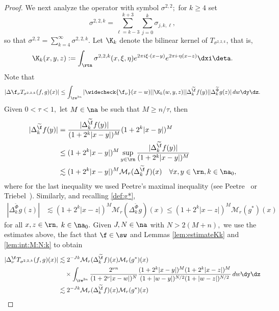 \begin{proof}
We next analyze the operator with  symbol $\sigma^{2,2};$ for $k \geq 4$ set 
\begin{equation*}
\sigma^{2,2,k}  = \sum\limits_{\ell =k-3}^{k+3} \sum\limits_{j=0}^k \sigma_{j,k,\ell},
\end{equation*}
so that $\sigma^{2,2} = \sum\limits_{k=4}^\infty \sigma^{2,2,k}.$ 
 Let $\K_k$ denote the bilinear kernel of  $T_{\sigma^{2,2,k}}$, that is,
$$
\K_k(x,y,z):= \int_{\rtn} \sigma^{2,2,k}(x, \xi, \eta) e^{2\pi i \xi \cdot( x- y)} e^{2\pi i \cdot \eta (x-z)} \dxi \deta.
$$
Note that
\begin{align*}
| \Delta{\f}_\nu T_{\sigma^{2,2,k}}(f,g)(x)| \leq \int_{\re^{3n}} |\widecheck{\f_\nu}(x- w)| |\K_k(w, y, z)| |\Delta^{\widetilde{\f}}_k f(y)| |\Delta^{\widetilde{\Phi}}_k g(z)| \, dw \dy \dz.
\end{align*}
Given $0<\tau <1,$  let $M \in \na$ be such that $M \geq n/\tau$, then
\begin{align*}
|\Delta^{\widetilde{\f}}_k f(y)|&  = \frac{|\Delta^{\widetilde{\f}}_k f(y)|}{(1 + 2^k |x-y|)^M} (1 + 2^k |x-y|)^M\\
& \leq  (1 + 2^k |x-y|)^M \sup_{y\in\rn} \frac{|\Delta^{\widetilde{\f}}_k f(y)|}{(1 + 2^k |x-y|)^M} \\
& \lesssim (1 + 2^k |x-y|)^M \mathcal{M}_r(\Delta^{\widetilde{\f}}_k f)(x)\quad\forall x,y\in\rn,k\in\na_0,
\end{align*}
where for the last inequality we used Peetre's maximal inequality (see Peetre~\cite{MR0380394} or Triebel~\cite[p.16, Theorem 1.3.1]{MR3024598}). Similarly, and recalling \eqref{def:g*},
\begin{align*}
|\Delta^{\widetilde{\Phi}}_k g(z)| & \lesssim (1 + 2^k |x-z|)^M \mathcal{M}_r(\Delta^{\widetilde{\Phi}}_k g)(x)  \leq (1 + 2^k |x-z|)^M \mathcal{M}_r(g^*)(x)
\end{align*}
for all $ x,z\in\rn,$ $k\in\na_0.$
Given $J, N \in \na$ with $N>2(M+n),$  we use the estimates above, the fact that $\f\in\sw$ and Lemmas \ref{lem:estimateKk} and  \ref{lem:int:M:N:k} to obtain 
\begin{align*}
 |\Delta^{\f}_\nu T_{\sigma^{2,2,k}}(f,g)(x)| &\lesssim 2^{-Jk} \mathcal{M}_r(\Delta^{\widetilde{\f}}_k f)(x) \mathcal{M}_r(g^*)(x)\\
 &\quad\times \int_{\re^{3n}} \frac{2^{\nu n}}{(1+ 2^\nu |x- w|)^N} \frac{(1 + 2^k |x-y|)^M (1 + 2^k |x-z|)^M}{(1+ |w-y|)^{N/2} (1+ |w-z|)^{N/2}} \, dw \dy \dz\\
&\lesssim 2^{-Jk} \mathcal{M}_r(\Delta^{\widetilde{\f}}_k f)(x) \mathcal{M}_r(g^*)(x)\\

\end{align*}
\end{proof}
